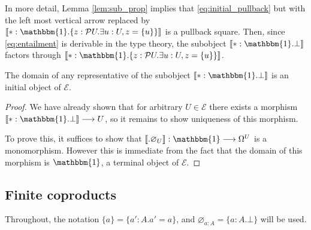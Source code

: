 \documentclass{tac}
\newcommand{\call}[1]{\mathcal{#1}}
\newcommand{\lto}{\longrightarrow}
\begin{document}
	In more detail, Lemma \ref{lem:sub_prop} implies that \eqref{eq:initial_pullback} but with the left most vertical arrow replaced by $\llbracket \ast:\mathbbm{1}. \lbrace z: \call{P}U . \exists u:U, z = \lbrace u \rbrace \rbrace\rrbracket$ is a pullback square. Then, since \eqref{eq:entailment} is derivable in the type theory, the subobject $\llbracket \ast:\mathbbm{1}. \bot\rrbracket$ factors through $\llbracket \ast:\mathbbm{1}. \lbrace z: \call{P}U . \exists u:U, z = \lbrace u \rbrace \rbrace\rrbracket$.
	\begin{proposition}\label{prop:initial}
		The domain of any representative of the subobject $\llbracket \ast: \mathbbm{1} . \bot \rrbracket$ is an initial object of $\call{E}$.
	\end{proposition}
	\begin{proof}
		We have already shown that for arbitrary $U \in \call{E}$ there exists a morphism $\llbracket \ast : \mathbbm{1} . \bot \rrbracket \lto U$, so it remains to show uniqueness of this morphism.
		
		To prove this, it suffices to show that $\llbracket . \varnothing_U\rrbracket: \mathbbm{1} \lto \Omega^U$ is a monomorphism. However this is immediate from the fact that the domain of this morphism is $\mathbbm{1}$, a terminal object of $\call{E}$.
	\end{proof}
	
	\subsection{Finite coproducts}\label{sec:coproducts}
	Throughout, the notation $\lbrace a \rbrace = \lbrace a' : A. a' = a\rbrace$, and $\varnothing_{a:A} = \lbrace a:A . \bot\rbrace$ will be used.
	
\end{document}
